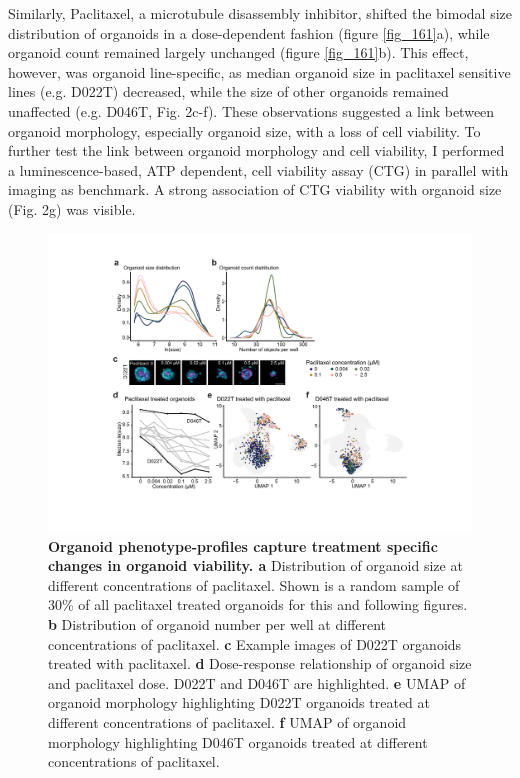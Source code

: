 \begin{flushleft}
Similarly, Paclitaxel, a microtubule disassembly inhibitor, shifted the bimodal size distribution of organoids in a dose-dependent fashion (figure \ref{fig_161}a), while organoid count remained largely unchanged (figure \ref{fig_161}b). This effect, however, was organoid line-specific, as median organoid size in paclitaxel sensitive lines (e.g. D022T) decreased, while the size of other organoids remained unaffected (e.g. D046T, Fig. 2c-f). These observations suggested a link between organoid morphology, especially organoid size, with a loss of cell viability. To further test the link between organoid morphology and cell viability, I performed a luminescence-based, ATP dependent, cell viability assay (CTG) in parallel with imaging as benchmark. A strong association of CTG viability with organoid size (Fig. 2g) was visible. 

\begin{figure}[H]
\centering
\includegraphics[width=\textwidth,
                height=\textheight,
                keepaspectratio]{figures/promise/pdf/fig_2_2.pdf}
\caption{\textbf{Organoid phenotype-profiles capture treatment specific changes in organoid viability. a} Distribution of organoid size at different concentrations of paclitaxel. Shown is a random sample of 30\% of all paclitaxel treated organoids for this and following figures. \textbf{b} Distribution of organoid number per well at different concentrations of paclitaxel. \textbf{c} Example images of D022T organoids treated with paclitaxel. \textbf{d} Dose-response relationship of organoid size and paclitaxel dose. D022T and D046T are highlighted. \textbf{e} UMAP of organoid morphology highlighting D022T organoids treated at different concentrations of paclitaxel. \textbf{f} UMAP of organoid morphology highlighting D046T organoids treated at different concentrations of paclitaxel.}
\label{fig_222}
\end{figure}
\bigbreak


\end{flushleft}
